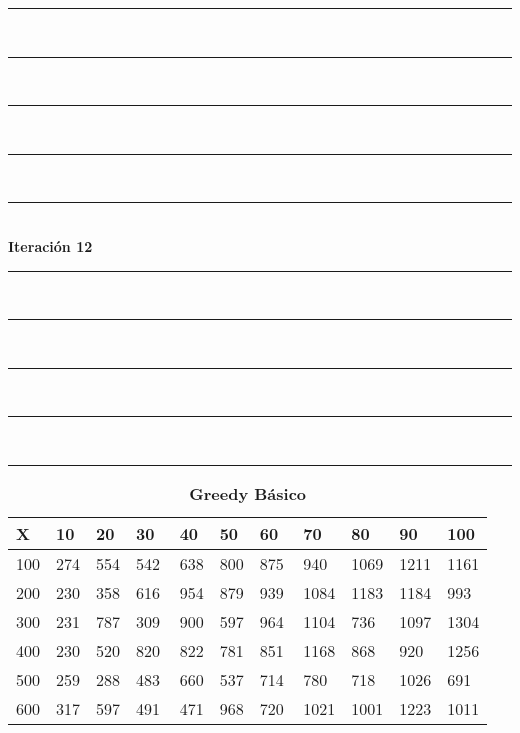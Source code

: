 \documentclass[10pt,letterpaper]{article}
\begin{document}
\newpage 
\begin{center}
\newcommand{\HRule}{\rule{\linewidth}{0.5mm}}
\center
\HRule\\[6cm]
\HRule\\[0.4cm]
\HRule\\[0.4cm]
\HRule\\[0.4cm]
\HRule\\[0.4cm]
{\centering \Huge\bfseries Iteración 12}\\[0.4cm]
\HRule\\[0.4cm]
\HRule\\[0.4cm]
\HRule\\[0.4cm]
\HRule\\[6cm]
\HRule
\end{center}
\newpage 
{}
\begin{center}
\begin{table}\renewcommand{\arraystretch}{2.5}
\caption{\large \textbf{Greedy Básico}}
\centering
\begin{tabular} { |m{0.5cm}|m{1.3cm}|m{1.3cm}|m{1.3cm}|m{1.3cm}|m{1.3cm}|m{1.3cm}|m{1.3cm}|m{1.3cm}|m{1.3cm}|m{1.3cm}|} 
\hline
\rowcolor{Gray}
\centering \textbf{X} & \centering \textbf{10} & \centering \textbf{20} & \centering \textbf{30}\ & \centering \textbf{40} & \centering \textbf{50} & \centering \textbf{60}\ & \centering \textbf{70} & \centering \textbf{80} & \centering \textbf{90}\ & \textbf{100} \\\hline
\cellcolor{Gray}100 & \Large 274 & \Large 554 & \Large 542 & \Large 638 & \Large 800 & \Large 875 & \Large 940 & \Large 1069 & \Large 1211 & \Large 1161 \\
\hline
\cellcolor{Gray}200 & \Large 230 & \Large 358 & \Large 616 & \Large 954 & \Large 879 & \Large 939 & \Large 1084 & \Large 1183 & \Large 1184 & \Large 993 \\
\hline
\cellcolor{Gray}300 & \Large 231 & \Large 787 & \Large 309 & \Large 900 & \Large 597 & \Large 964 & \Large 1104 & \Large 736 & \Large 1097 & \Large 1304 \\
\hline
\cellcolor{Gray}400 & \Large 230 & \Large 520 & \Large 820 & \Large 822 & \Large 781 & \Large 851 & \Large 1168 & \Large 868 & \Large 920 & \Large 1256 \\
\hline
\cellcolor{Gray}500 & \Large 259 & \Large 288 & \Large 483 & \Large 660 & \Large 537 & \Large 714 & \Large 780 & \Large 718 & \Large 1026 & \Large 691 \\
\hline
\cellcolor{Gray}600 & \Large 317 & \Large 597 & \Large 491 & \Large 471 & \Large 968 & \Large 720 & \Large 1021 & \Large 1001 & \Large 1223 & \Large 1011 \\

\end{tabular}
\end{table}
\end{center}
\end{document}
